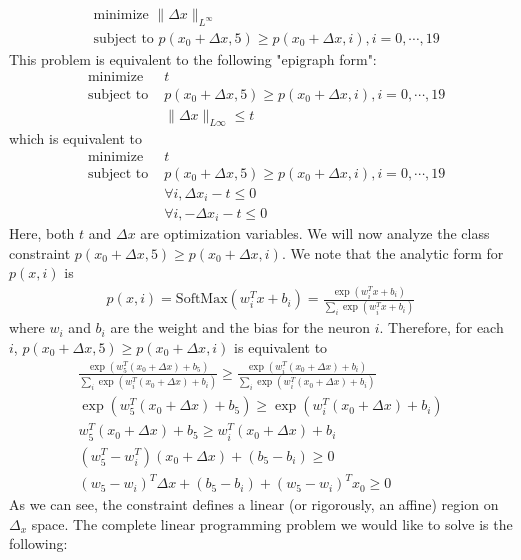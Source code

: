 \documentclass[
	12pt, %
]{../Template/fphw}
\begin{document}
\begin{enumerate}[label = (\arabic*)]
\begin{align}
        &\textrm{minimize } \|\Delta x\|_{L^\infty} \\
        &\textrm{subject to } p(x_0+\Delta x, 5) \geq p(x_0+\Delta x, i), i=0,\cdots ,19
    \end{align}
    This problem is equivalent to the following "epigraph form":
        \begin{align}
        &\textrm{minimize } &t \\
        &\textrm{subject to } &p(x_0+\Delta x, 5) \geq p(x_0+\Delta x, i), i=0,\cdots ,19  \\
        & & \|\Delta x\|_{L\infty}\leq t
    \end{align}
    which is equivalent to
    \begin{align}
        &\textrm{minimize } &t \\
        &\textrm{subject to } &p(x_0+\Delta x, 5) \geq p(x_0+\Delta x, i), i=0,\cdots ,19  \\
        & & \forall i, \Delta x_i -t \leq 0\\
        & & \forall i, -\Delta x_i -t \leq 0
    \end{align}
    Here, both $t$ and $\Delta x$ are optimization variables. We will now analyze the class constraint $p(x_0+\Delta x, 5) \geq p(x_0+\Delta x, i)$. We note that the analytic form for $p(x,i)$ is
    \begin{align}
        p(x,i) = \textrm{SoftMax}(w^T_ix+b_i) = \frac{\exp(w^T_ix+b_i)}{\sum_{i}\exp(w^T_ix+b_i)}
    \end{align}
    where $w_i$ and $b_i$ are the weight and the bias for the neuron $i$. Therefore, for each $i$, $p(x_0+\Delta x,5)\geq p(x_0+\Delta x, i)$ is equivalent to
    \begin{align}
        \frac{\exp(w^T_5(x_0+\Delta x)+b_5)}{\sum_{i}\exp(w^T_i(x_0+\Delta x)+b_i)} \geq \frac{\exp(w^T_i(x_0+\Delta x)+b_i)}{\sum_{i}\exp(w^T_i(x_0+\Delta x)+b_i)} \\
        \exp(w^T_5(x_0+\Delta x)+b_5) \geq\exp(w^T_i(x_0+\Delta x)+b_i) \\
        w^T_5(x_0+\Delta x)+b_5 \geq w^T_i(x_0+\Delta x)+b_i \\
        (w^T_5-w^T_i)(x_0+\Delta x)+(b_5-b_i)\geq 0 \\
        (w_5-w_i)^T \Delta x + (b_5-b_i) + (w_5-w_i)^Tx_0 \geq 0
    \end{align}
    As we can see, the constraint defines a linear (or rigorously, an affine) region on $\Delta_x$ space. The complete linear programming problem we would like to solve is the following:

\end{enumerate}
\end{document}
